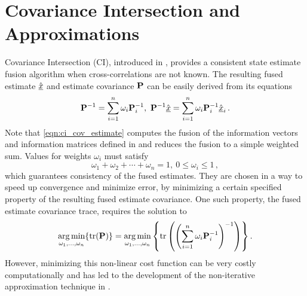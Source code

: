 \documentclass[letterpaper, 10 pt, conference]{ieeeconf}  %
\begin{document}



\section{Covariance Intersection and Approximations} \label{sec:ci}
Covariance Intersection (CI), introduced in \cite{julierNondivergentEstimationAlgorithm1997}, provides a consistent state estimate fusion algorithm when cross-correlations are not known. The resulting fused estimate $\hat{{\underline{x}}}$ and estimate covariance ${{\mathbf{P}}}$ can be easily derived from its equations
\begin{equation}
   {\ensuremath{{\mathbf{P}}}}^{-1}=\sum_{i=1}^{n}\omega_i {{\mathbf{P}}}_i^{-1},\ {{\mathbf{P}}}^{-1} \hat{{\underline{x}}} =\sum_{i=1}^{n}\omega_i {{\mathbf{P}}}_i^{-1} \hat{{\underline{x}}}_i\,. \label{eqn:ci_cov_estimate}
\end{equation}
Note that \eqref{eqn:ci_cov_estimate} computes the fusion of the information vectors and information matrices defined in \cite{niehsenInformationFusionBased2002} and reduces the fusion to a simple weighted sum.
Values for weights $\omega_i$ must satisfy
\begin{equation}
   \omega_1 + \omega_2 + \cdots + \omega_n = 1,\ 0 \leq \omega_i \leq 1\,, \label{eqn:ci_omega_sum_bound}
\end{equation}
which guarantees consistency of the fused estimates. They are chosen in a way to speed up convergence and minimize error, by minimizing a certain specified property of the resulting fused estimate covariance. One such property, the fused estimate covariance trace, requires the solution to
\begin{equation}
   \operatorname*{arg\,min}_{\omega_1,\dots,\omega_n} \{\operatorname{tr}({{\mathbf{P}}})\} = \operatorname*{arg\,min}_{\omega_1,\dots,\omega_n} \left\{\operatorname{tr}\left(\left(\sum_{i=1}^{n}\omega_i {{\mathbf{P}}}_i^{-1}\right)^{-1}\right)\right\}. \label{eqn:ci_trace_min}
\end{equation}
However, minimizing this non-linear cost function can be very costly computationally and has led to the development of the non-iterative approximation technique in \cite{niehsenInformationFusionBased2002}.
\end{document}
